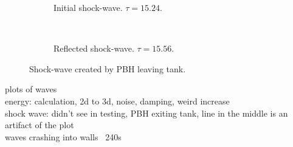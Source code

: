 \documentclass[12pt]{report}
\begin{document}
\begin{figure}
\centering
\begin{subfigure}{\textwidth}

\caption{Initial shock-wave. $\tau  = 15.24$.}
\end{subfigure} \\
\begin{subfigure}{\textwidth}

\caption{Reflected shock-wave. $\tau = 15.56$.}
\end{subfigure}
\caption{Shock-wave created by PBH leaving tank.}
\end{figure}


plots of waves \\
energy: calculation, 2d to 3d, noise, damping, weird increase \\
shock wave: didn't see in testing, PBH exiting tank, line in the middle is an artifact of the plot \\
waves crashing into walls ~240s
\end{document}
